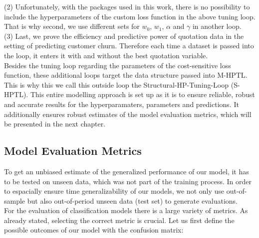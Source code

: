 \documentclass[12pt,titlepage]{article}
\begin{document}
(2) Unfortunately, with the packages used in this work, there is no possibility to include the hyperparameters of the custom loss function in the above tuning loop. That is why second, we use different sets for $w_{0}$, $w_{1}$, $\alpha$ and $\gamma$ in another loop. \\
(3) Last, we prove the efficiency and predictive power of quotation data in the setting of predicting customer churn. Therefore each time a dataset is passed into the loop, it enters it with and without the best quotation variable. \\
Besides the tuning loop regarding the parameters of the cost-sensitive loss function, these additional loops target the data structure passed into M-HPTL. This is why this we call this outside loop the Structural-HP-Tuning-Loop (S-HPTL). This entire modelling approach is set up as it is to ensure reliable, robust and accurate results for the hyperparamaters, parameters and predictions. It additionally ensures robust estimates of the model evaluation metrics, which will be presented in the next chapter. \\


\subsection{Model Evaluation Metrics} \par

To get an unbiased estimate of the generalized performance of our model, it has to be tested on unseen data, which was not part of the training process. In order to espacially ensure time generalizability of our models, we not only use out-of-sample but also out-of-period unseen data (test set) to generate evaluations. \\
For the evaluation of classification models there is a large variety of metrics. As already stated, selecting the correct metric is crucial. Let us first define the possible outcomes of our model with the confusion matrix: \\

\renewcommand{\arraystretch}{2}
\end{document}

